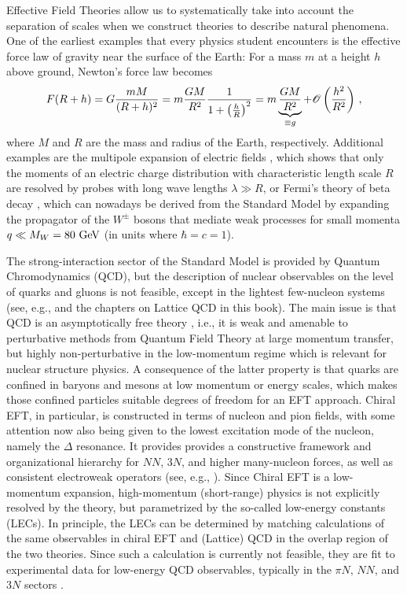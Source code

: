 {Effective Field Theories allow us to systematically take into account the separation of
scales when we construct theories to describe natural phenomena. One
of the earliest examples that every physics student encounters is the 
effective force law of gravity near the surface of the Earth: For a
mass $m$ at a height $h$ above ground, Newton's force law becomes
\begin{equation}
  F(R+h) = G\frac{m M}{(R+h)^2} = m \frac{GM}{R^2} \frac{1}{1+\left(\frac{h}{R}\right)^2}
  =m \underbrace{\frac{GM}{R^2}}_{\equiv g} + \mathcal{O}\left(\frac{h^2}{R^2}\right)\,,
\end{equation}
where $M$ and $R$ are the mass and radius of the Earth, respectively.
Additional examples are the multipole expansion of electric fields 
\cite{Jackson:1999yg}, which shows that only the moments of an electric
charge distribution with characteristic length scale $R$ are resolved
by probes with long wave lengths $\lambda\gg R$, or Fermi's theory of 
beta decay \cite{Fermi:1934eu}, which can nowadays be derived from the
Standard Model by expanding the propagator of the $W^\pm$ bosons that
mediate weak processes for small momenta $q\ll M_W=80\,\,\text{GeV}$ (in units
where $\hbar=c=1$).

The strong-interaction sector of the Standard Model is provided by
Quantum Chromodynamics (QCD), but the description of nuclear
observables on the level of quarks and gluons is not feasible, except
in the lightest few-nucleon systems (see, e.g., \cite{Detmold:2015xw}
and the chapters on Lattice QCD in this book). The main issue is that
QCD is an asymptotically free theory
\cite{Gross:1973pd,Politzer:1973lq}, i.e., it is weak and amenable to
perturbative methods from Quantum Field Theory at large momentum
transfer, but highly non-perturbative in the low-momentum regime which
is relevant for nuclear structure physics. A consequence of the latter
property is that quarks are confined in baryons and mesons at low
momentum or energy scales, which makes those confined particles
suitable degrees of freedom for an EFT approach. Chiral EFT, in
particular, is constructed in terms of nucleon and pion fields, with
some attention now also being given to the lowest excitation mode of
the nucleon, namely the $\Delta$ resonance.  It provides provides a
constructive framework and organizational hierarchy for $NN$, $3N$,
and higher many-nucleon forces, as well as consistent electroweak
operators (see, e.g.,
\cite{Epelbaum:2009ve,Machleidt:2011bh,Epelbaum:2015gf,Entem:2015qf,Gezerlis:2014zr,Lynn:2016ec,Pastore:2009zr,Pastore:2011dq,Piarulli:2013vn,Kolling:2009yq,Kolling:2011bh}).
Since Chiral EFT is a low-momentum expansion, high-momentum
(short-range) physics is not explicitly resolved by the theory, but
parametrized by the so-called low-energy constants (LECs).  In
principle, the LECs can be determined by matching calculations of the
same observables in chiral EFT and (Lattice) QCD in the overlap region
of the two theories. Since such a calculation is currently not
feasible, they are fit to experimental data for low-energy QCD
observables, typically in the $\pi{}N$, $NN$, and $3N$ sectors
\cite{Epelbaum:2009ve,Machleidt:2011bh,Ekstrom:2015fk,Shirokov:2016wo}.

}

